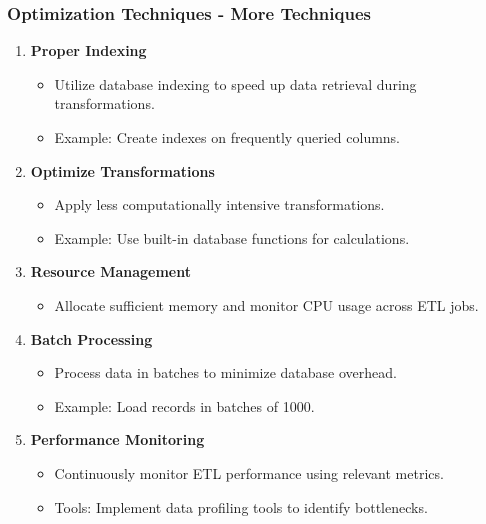 \documentclass{beamer}
\begin{document}
\begin{frame}[fragile]
    \frametitle{Optimization Techniques - More Techniques}
    \begin{enumerate}[resume]
        \item \textbf{Proper Indexing}
        \begin{itemize}
            \item Utilize database indexing to speed up data retrieval during transformations.
            \item Example: Create indexes on frequently queried columns.
        \end{itemize}
        
        \item \textbf{Optimize Transformations}
        \begin{itemize}
            \item Apply less computationally intensive transformations.
            \item Example: Use built-in database functions for calculations.
        \end{itemize}
        
        \item \textbf{Resource Management}
        \begin{itemize}
            \item Allocate sufficient memory and monitor CPU usage across ETL jobs.
        \end{itemize}
        
        \item \textbf{Batch Processing}
        \begin{itemize}
            \item Process data in batches to minimize database overhead.
            \item Example: Load records in batches of 1000.
        \end{itemize}
        
        \item \textbf{Performance Monitoring}
        \begin{itemize}
            \item Continuously monitor ETL performance using relevant metrics.
            \item Tools: Implement data profiling tools to identify bottlenecks.
        \end{itemize}
    \end{enumerate}
\end{frame}
\end{document}
